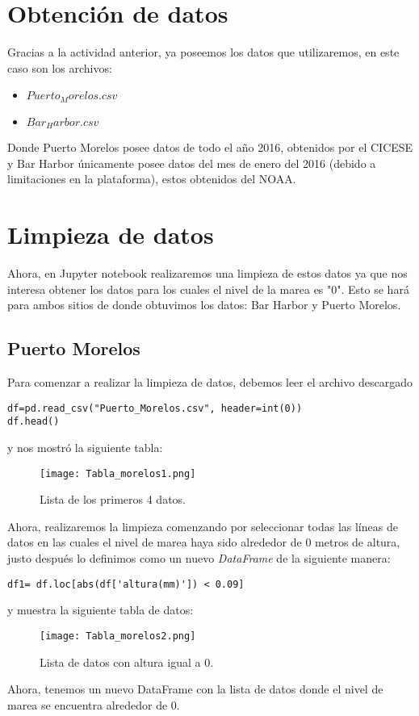 \documentclass{article}
\begin{document}
\section{\Large Obtención de datos}
\large Gracias a la actividad anterior, ya poseemos los datos que utilizaremos, en este caso son los archivos:
\begin{itemize}
\item $Puerto_Morelos.csv$
\item $Bar_Harbor.csv$
\end{itemize}
Donde Puerto Morelos posee datos de todo el año 2016, obtenidos por el CICESE y Bar Harbor únicamente posee datos del mes de enero del 2016 (debido a limitaciones en la plataforma), estos obtenidos del NOAA.\\

\section{\Large Limpieza de datos}
Ahora, en Jupyter notebook realizaremos una limpieza de estos datos ya que nos interesa obtener los datos para los cuales el nivel de la marea es "0". Esto se hará para ambos sitios de donde obtuvimos los datos: Bar Harbor y Puerto Morelos.

\subsection{Puerto Morelos}
Para comenzar a realizar la limpieza de datos, debemos leer el archivo descargado
\begin{verbatim}
df=pd.read_csv("Puerto_Morelos.csv", header=int(0))
df.head()
\end{verbatim}
y nos mostró la siguiente tabla:

\begin{figure}[ht!]
\centering
\texttt{[image: Tabla\_morelos1.png]}
\caption{Lista de los primeros 4 datos.}
\end{figure}
Ahora, realizaremos la limpieza comenzando por seleccionar todas las líneas de datos en las cuales el nivel de marea haya sido alrededor de 0 metros de altura, justo después lo definimos como un nuevo \textit{DataFrame} de la siguiente manera:
\begin{verbatim}
df1= df.loc[abs(df['altura(mm)']) < 0.09]
\end{verbatim}
\newpage
y muestra la siguiente tabla de datos:
\begin{figure}[ht!]
\centering
\texttt{[image: Tabla\_morelos2.png]}
\caption{Lista de datos con altura igual a 0.}
\end{figure}
Ahora, tenemos un nuevo DataFrame con la lista de datos donde el nivel de marea se encuentra alrededor de 0.
\end{document}
